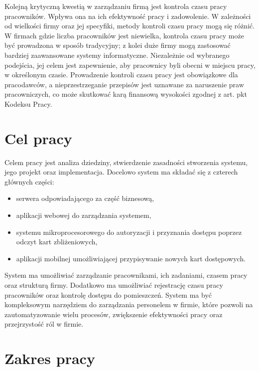 Kolejną krytyczną kwestią w zarządzaniu firmą jest kontrola czasu pracy pracowników. Wpływa ona na ich efektywność pracy i zadowolenie. W zależności od wielkości firmy oraz jej specyfiki, metody kontroli czasu pracy mogą się różnić. W firmach gdzie liczba pracowników jest niewielka, kontrola czasu pracy może być prowadzona w sposób tradycyjny; z kolei duże firmy mogą zastosować bardziej zaawansowane systemy informatyczne. Niezależnie od wybranego podejścia, jej celem jest zapewnienie, aby pracownicy byli obecni w miejscu pracy, w określonym czasie. Prowadzenie kontroli czasu pracy jest obowiązkowe dla pracodawców, a nieprzestrzeganie przepisów jest uznawane za naruszenie praw pracowniczych, co może skutkować karą finansową wysokości zgodnej z art.  pkt  Kodeksu Pracy. \cite{bib:KodeksPracy}

\section{Cel pracy}


Celem pracy jest analiza dziedziny, stwierdzenie zasadności stworzenia systemu, jego projekt oraz implementacja. Docelowo system ma składać się z czterech głównych części:

\begin{itemize}
    \item serwera odpowiadającego za część biznesową,
    \item aplikacji webowej do zarządzania systemem,
    \item systemu mikroprocesorowego do autoryzacji i przyznania dostępu poprzez odczyt kart zbliżeniowych,
    \item aplikacji mobilnej umożliwiającej przypisywanie nowych kart dostępowych.
\end{itemize}

System ma umożliwiać zarządzanie pracownikami, ich zadaniami, czasem pracy oraz strukturą firmy. Dodatkowo ma umożliwiać rejestrację czasu pracy pracowników oraz kontrolę dostępu do pomieszczeń. System ma być kompleksowym narzędziem do zarządzania personelem w firmie, które pozwoli na zautomatyzowanie wielu procesów, zwiększenie efektywności pracy oraz przejrzystość ról w firmie.

\section{Zakres pracy}

